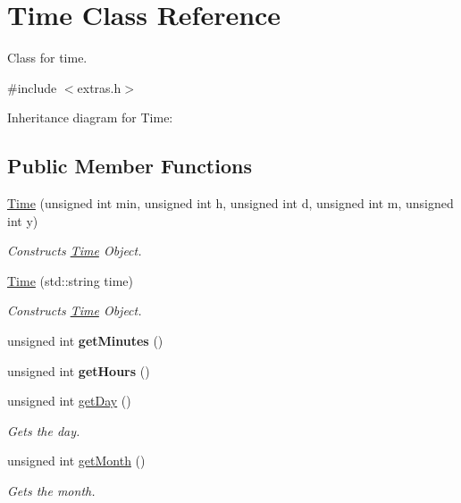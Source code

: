 \hypertarget{classTime}{}\section{Time Class Reference}
\label{classTime}


Class for time.  




{\ttfamily \#include $<$extras.\+h$>$}



Inheritance diagram for Time\+:
\subsection*{Public Member Functions}
\begin{DoxyCompactItemize}
\item 
\hyperlink{classTime_a355bb7292c28e01866289e1119f457a9}{Time} (unsigned int min, unsigned int h, unsigned int d, unsigned int m, unsigned int y)
\begin{DoxyCompactList}\small\item\em Constructs \hyperlink{classTime}{Time} Object. \end{DoxyCompactList}\item 
\hyperlink{classTime_a15f171401599a9a058e89e6cf3244f2b}{Time} (std\+::string time)
\begin{DoxyCompactList}\small\item\em Constructs \hyperlink{classTime}{Time} Object. \end{DoxyCompactList}\item 
\mbox{\label{classTime_a800d91da444cd295a329925c45942359}} 
unsigned int {\bfseries get\+Minutes} ()
\item 
\mbox{\label{classTime_ac38ba7bbc9876d7d75c6fb16ba7ac453}} 
unsigned int {\bfseries get\+Hours} ()
\item 
unsigned int \hyperlink{classTime_abdccc37217b520155a67a1d732014f1a}{get\+Day} ()
\begin{DoxyCompactList}\small\item\em Gets the day. \end{DoxyCompactList}\item 
unsigned int \hyperlink{classTime_a22fd86b14d3b067cf1447fd9ca5caf6f}{get\+Month} ()
\begin{DoxyCompactList}\small\item\em Gets the month. \end{DoxyCompactList}\item 

\end{DoxyCompactItemize}

